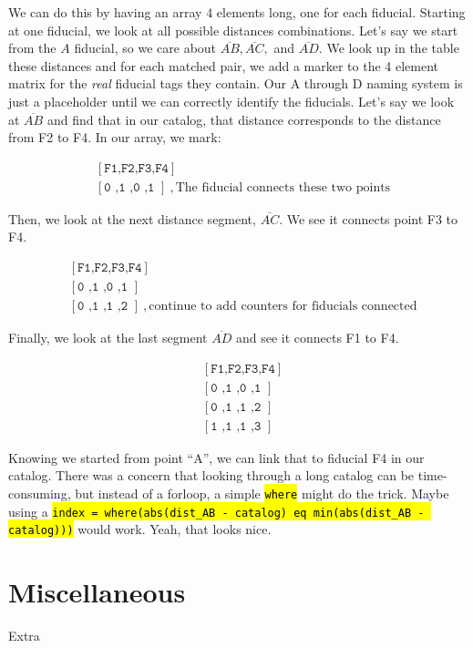 \documentclass[10pt]{scrartcl}
\begin{document}
We can do this by having an array 4 elements long, one for each fiducial. Starting at one fiducial, we look at all possible distances combinations. Let's say we start from the $A$ fiducial, so we care about $\overline{AB},\overline{AC},$ and $\overline{AD}$. We look up in the table these distances and for each matched pair, we add a marker to the 4 element matrix for the \emph{real} fiducial tags they contain. Our A through D naming system is just a placeholder until we can correctly identify the fiducials. Let's say we look at $\overline{AB}$ and find that in our catalog, that distance corresponds to the distance from F2 to F4. In our array, we mark:

\begin{align}
  &[\texttt{F1,F2,F3,F4}]\\
  &[\texttt{0 ,1 ,0 ,1 }]~,\textrm{The fiducial connects these two points}
\end{align}

Then, we look at the next distance segment, $\overline{AC}$. We see it connects point F3 to F4.

\begin{align}
  &[\texttt{F1,F2,F3,F4}]\\
  &[\texttt{0 ,1 ,0 ,1 }]\\
  &[\texttt{0 ,1 ,1 ,2 }]~,\textrm{continue to add counters for fiducials connected}
\end{align}

Finally, we look at the last segment $\overline{AD}$ and see it connects F1 to F4.

\begin{align}
  &[\texttt{F1,F2,F3,F4}]\\
  &[\texttt{0 ,1 ,0 ,1 }]\\
  &[\texttt{0 ,1 ,1 ,2 }]\\
  &[\texttt{1 ,1 ,1 ,3 }]
\end{align}


Knowing we started from point ``A'', we can link that to fiducial F4 in our catalog. There was a concern that looking through a long catalog can be time-consuming, but instead of a forloop, a simple \hl{\texttt{where}} might do the trick. Maybe using a \hl{\texttt{index = where(abs(dist\_AB - catalog) eq min(abs(dist\_AB - catalog)))}} would work. Yeah, that looks nice.



\section{Miscellaneous} %
\label{sec:miscellaneous}
Extra
\end{document}
